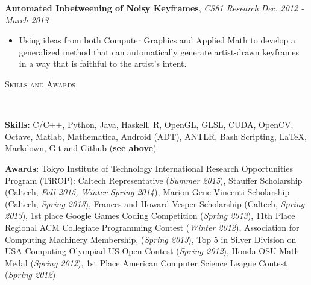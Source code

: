\documentclass[9pt]{article}
\newenvironment{changemargin}[2]{%
  \begin{list}{}{%
    \setlength{\topsep}{0pt}%
    \setlength{\leftmargin}{#1}%
    \setlength{\rightmargin}{#2}%
    \setlength{\listparindent}{\parindent}%
    \setlength{\itemindent}{\parindent}%
    \setlength{\parsep}{\parskip}%
  }%
  \item[]}{\end{list}
}
\newcommand{\lineover}{
	\begin{changemargin}{-0.05in}{-0.05in}
		\vspace*{-8pt}
		\hrulefill \\
		\vspace*{-2pt}
	\end{changemargin}
}
\newcommand{\header}[1]{
	\begin{changemargin}{-0.5in}{-0.5in}
		\scshape{#1}\\
  	\lineover
	\end{changemargin}
}
\newenvironment{body} {
	\vspace*{-16pt}
	\begin{changemargin}{-0.25in}{-0.5in}
  }	
	{\end{changemargin}
}
\begin{document}
\begin{body}
\begin{itemize}
	\end{itemize}
	\textbf{Automated Inbetweening of Noisy Keyframes}, \emph{CS81 Research} \hfill \emph{Dec. 2012 - March 2013} \\
		\vspace*{-3pt}
	\begin{itemize} \itemsep -0pt
		\item Using ideas from both Computer Graphics and Applied Math to develop a generalized method that can automatically generate artist-drawn keyframes in a way that is faithful to the artist's intent.
	\end{itemize}

\end{body}

\smallskip

\header{Skills and Awards}
\smallskip
\begin{body}
	\vspace{18pt}
	
	\textbf{Skills:} C/C++, Python, Java, Haskell, R, OpenGL, GLSL, CUDA, OpenCV, Octave, Matlab, Mathematica, Android (ADT), ANTLR, Bash Scripting, \LaTeX, Markdown, Git and Github (\textbf{see above})\\
	
	\medskip
	
	\textbf{Awards:} Tokyo Institute of Technology International Research Opportunities Program (TiROP): Caltech Representative (\emph{Summer 2015}), Stauffer Scholarship (Caltech, \emph{Fall 2015, Winter-Spring 2014}), Marion Gene Vincenti Scholarship (Caltech, \emph{Spring 2013}),
        Frances and Howard Vesper Scholarship (Caltech, \emph{Spring 2013}),
        1st place Google Games Coding Competition (\emph{Spring 2013}),
        11th Place Regional ACM Collegiate Programming Contest (\emph{Winter 2012}),
        Association for Computing Machinery Membership, (\emph{Spring 2013}),
        Top 5 in Silver Division on USA Computing Olympiad US Open Contest (\emph{Spring 2012}),
        Honda-OSU Math Medal (\emph{Spring 2012}),
        1st Place American Computer Science League Contest (\emph{Spring 2012})
	
	
%
\end{body}
\end{document}
